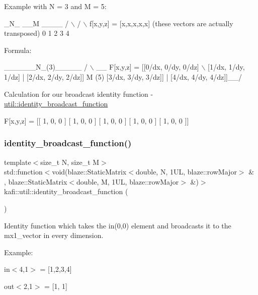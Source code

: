 Example with {\ttfamily N = 3} and {\ttfamily M = 5}\+: 
\begin{DoxyCode}
   \_N\_        \_\_M \_\_\_\_    
  /   \(\backslash\)      /        \(\backslash\)
f[x,y,z] =  [x,x,x,x,x]    (these vectors are actually transposed)
             0 1 2 3 4
\end{DoxyCode}
 Formula\+: 
\begin{DoxyCode}
             \_\_\_\_\_\_N\_(3)\_\_\_\_\_
            /                \(\backslash\) \_\_
F[x,y,z] = [[0/dx, 0/dy, 0/dz]   \(\backslash\)
            [1/dx, 1/dy, 1/dz]   |
            [2/dx, 2/dy, 2/dz]]  M (5)
            [3/dx, 3/dy, 3/dz]]  |
            [4/dx, 4/dy, 4/dz]]\_\_/
\end{DoxyCode}
 Calculation for our broadcast identity function -\/ \hyperlink{namespacekafi_1_1util_a9a257c47aefec8bf7538ab2ee5c4027d}{util\+::identity\+\_\+broadcast\+\_\+function} 
\begin{DoxyCode}
F[x,y,z] = [[ 1, 0, 0 ]
            [ 1, 0, 0 ]
            [ 1, 0, 0 ]
            [ 1, 0, 0 ]
            [ 1, 0, 0 ]]
\end{DoxyCode}
 \mbox{\label{namespacekafi_1_1util_a9a257c47aefec8bf7538ab2ee5c4027d}} 
\subsubsection{\texorpdfstring{identity\+\_\+broadcast\+\_\+function()}{identity\_broadcast\_function()}}
{\footnotesize\ttfamily template$<$size\+\_\+t N, size\+\_\+t M$>$ \\
std\+::function$<$void(blaze\+::\+Static\+Matrix$<$double, N, 1\+U\+L, blaze\+::row\+Major$>$ \& , blaze\+::\+Static\+Matrix$<$double, M, 1\+U\+L, blaze\+::row\+Major$>$ \&)$>$ kafi\+::util\+::identity\+\_\+broadcast\+\_\+function (\begin{DoxyParamCaption}{ }\end{DoxyParamCaption})}



Identity function which takes the {\ttfamily in(0,0)} element and broadcasts it to the {\ttfamily mx1\+\_\+vector} in every dimension. 

Example\+:
\begin{DoxyItemize}
\item {\ttfamily in$<$4,1$>$ = \mbox{[}1,2,3,4\mbox{]}}
\item {\ttfamily out$<$2,1$>$ = \mbox{[}1, 1\mbox{]}}
\end{DoxyItemize}

